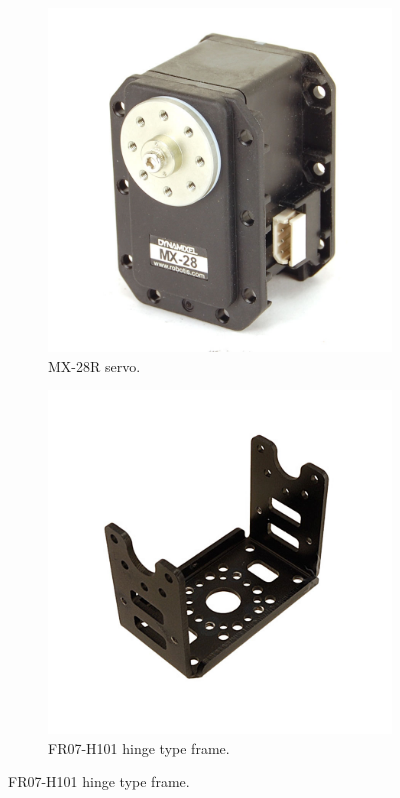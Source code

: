\begin{figure}[htp]
\center
    \begin{subfigure}[b]{0.4\textwidth}
    \center
    \includegraphics[width = \textwidth]{figures/mx28}
    \caption{MX-28R servo. \label{fig:mx28}}
    \end{subfigure}
    \hfill
    \begin{subfigure}[b]{0.4\textwidth}
    \center
    \includegraphics[width = \textwidth]{figures/fr07-h101}
    \caption{FR07-H101 hinge type frame. \label{fig:fr07-h101}}
    \end{subfigure}


\end{figure}
